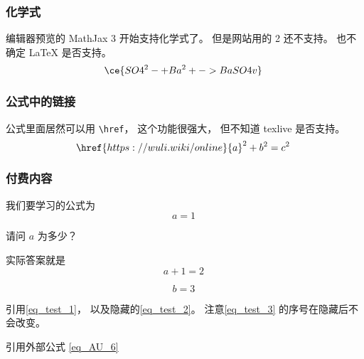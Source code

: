 \subsubsection{化学式}
编辑器预览的 MathJax 3 开始支持化学式了。 但是网站用的 2 还不支持。 也不确定 LaTeX 是否支持。
\begin{equation}
\ce{SO4^2- + Ba^2+ -> BaSO4 v}~
\end{equation}

\subsubsection{公式中的链接}
公式里面居然可以用 \verb|\href|， 这个功能很强大， 但不知道 texlive 是否支持。
\begin{equation}
\href{https://wuli.wiki/online}{a}^2 + b^2 = c^2~
\end{equation}

\subsubsection{付费内容}
我们要学习的公式为
\begin{equation}\label{eq_test_1}
a = 1~
\end{equation}

\begin{example}{}
请问 $a$ 为多少？
\pay

实际答案就是
\begin{equation}\label{eq_test_2}
a + 1 = 2~
\end{equation}
\paid
\end{example}

\begin{equation}\label{eq_test_3}
b = 3~
\end{equation}


引用\autoref{eq_test_1}， 以及隐藏的\autoref{eq_test_2}。 注意\autoref{eq_test_3} 的序号在隐藏后不会改变。

引用外部公式 \autoref{eq_AU_6}~
